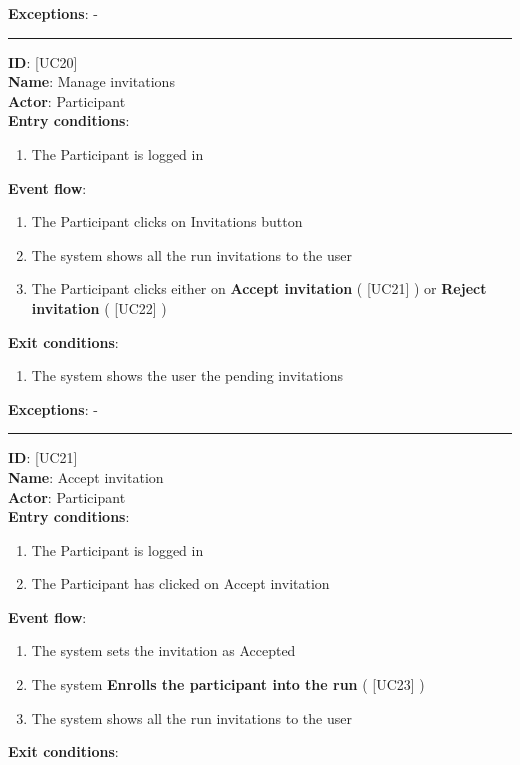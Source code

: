 \documentclass[12pt]{report}
\newcommand\usecase[1]{ [UC#1] }
\begin{document}
\begin{itemize}
\begin{enumerate}
  		\end{enumerate}
  	\textbf{Exceptions}: - \\
  	\rule{\linewidth}{0.4pt}
  	\textbf{ID}: \usecase{20} \\
  	\textbf{Name}: Manage invitations \\
    \textbf{Actor}: Participant \\
    \textbf{Entry conditions}: 
    		\begin{enumerate}
    			\item{The Participant is logged in}
    		\end{enumerate}
  	\textbf{Event flow}:
  		\begin{enumerate}
    			\item{The Participant clicks on Invitations button}
    			\item{The system shows all the run invitations to the user}
    			\item{The Participant clicks either on \textbf{Accept invitation} (\usecase{21}) or \textbf{Reject invitation} (\usecase{22})}
  		\end{enumerate}
  	\textbf{Exit conditions}:
  		\begin{enumerate}
    			\item{The system shows the user the pending invitations}
  		\end{enumerate}
  	\textbf{Exceptions}: - \\
  	\rule{\linewidth}{0.4pt}
  	\textbf{ID}: \usecase{21} \\
  	\textbf{Name}: Accept invitation \\
    \textbf{Actor}: Participant \\
    \textbf{Entry conditions}: 
    		\begin{enumerate}
    			\item{The Participant is logged in}
    			\item{The Participant has clicked on Accept invitation}
    		\end{enumerate}
  	\textbf{Event flow}:
  		\begin{enumerate}
    			\item{The system sets the invitation as Accepted}
    			\item{The system \textbf{Enrolls the participant into the run} (\usecase{23})}
    			\item{The system shows all the run invitations to the user}
  		\end{enumerate}
  	\textbf{Exit conditions}:
  		\begin{enumerate}

\end{enumerate}
\end{itemize}
\end{document}
